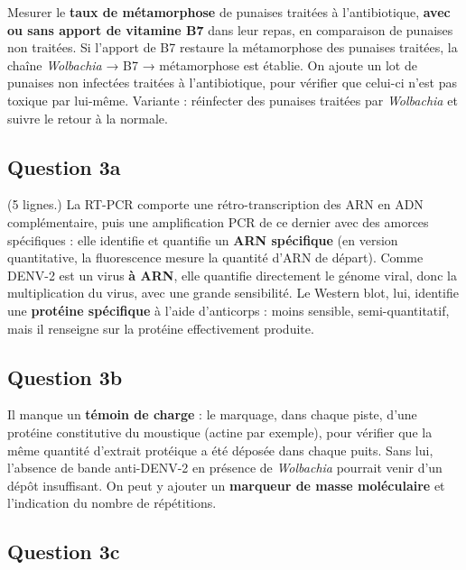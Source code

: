 \documentclass[11pt,a4paper]{article}
\begin{document}
Mesurer le \textbf{taux de métamorphose} de punaises traitées à l'antibiotique, \textbf{avec ou sans apport de vitamine B7} dans leur repas, en comparaison de punaises non traitées. Si l'apport de B7 restaure la métamorphose des punaises traitées, la chaîne \emph{Wolbachia} → B7 → métamorphose est établie. On ajoute un lot de punaises non infectées traitées à l'antibiotique, pour vérifier que celui-ci n'est pas toxique par lui-même. Variante : réinfecter des punaises traitées par \emph{Wolbachia} et suivre le retour à la normale.

\hypertarget{question-3a}{%
\subsection{Question 3a}\label{question-3a}}

(5 lignes.) La RT-PCR comporte une rétro-transcription des ARN en ADN complémentaire, puis une amplification PCR de ce dernier avec des amorces spécifiques : elle identifie et quantifie un \textbf{ARN spécifique} (en version quantitative, la fluorescence mesure la quantité d'ARN de départ). Comme DENV-2 est un virus \textbf{à ARN}, elle quantifie directement le génome viral, donc la multiplication du virus, avec une grande sensibilité. Le Western blot, lui, identifie une \textbf{protéine spécifique} à l'aide d'anticorps : moins sensible, semi-quantitatif, mais il renseigne sur la protéine effectivement produite.

\hypertarget{question-3b}{%
\subsection{Question 3b}\label{question-3b}}

Il manque un \textbf{témoin de charge} : le marquage, dans chaque piste, d'une protéine constitutive du moustique (actine par exemple), pour vérifier que la même quantité d'extrait protéique a été déposée dans chaque puits. Sans lui, l'absence de bande anti-DENV-2 en présence de \emph{Wolbachia} pourrait venir d'un dépôt insuffisant. On peut y ajouter un \textbf{marqueur de masse moléculaire} et l'indication du nombre de répétitions.

\hypertarget{question-3c}{%
\subsection{Question 3c}\label{question-3c}}
\end{document}
